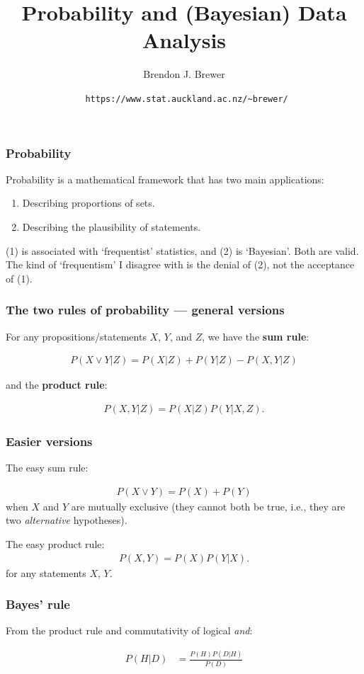 \documentclass{beamer}
\title{Probability and (Bayesian) Data Analysis}
\author{Brendon J. Brewer}
\institute{Department of Statistics\\
The University of Auckland}
\date{{\tt \color{blue} https://www.stat.auckland.ac.nz/\~{ }brewer/}}
\begin{document}
\frame{\titlepage}


\begin{frame}
\frametitle{Probability}

Probability is a mathematical framework that has two main applications:
\vspace{0.5em}
\begin{enumerate}
  \item[(1)] Describing proportions of sets.
  \item[(2)] Describing the plausibility of statements.
\end{enumerate}
\vspace{1em}
(1) is associated with `frequentist' statistics, and (2) is `Bayesian'.
Both are valid. The kind of `frequentism' I disagree with is the denial
of (2), not the acceptance of (1).

\end{frame}


\begin{frame}
\frametitle{The two rules of probability --- general versions}
For any propositions/statements $X$, $Y$, and $Z$, we have
the {\bf sum rule}:

\begin{align}
P(X \vee Y | Z) = P(X | Z) + P(Y | Z) - P(X, Y | Z)
\end{align}

and the {\bf product rule}:

\begin{align}
P(X, Y | Z) = P(X | Z)P(Y | X, Z).
\end{align}

\end{frame}


\begin{frame}
\frametitle{Easier versions}
The easy sum rule:

\begin{align}
P(X \vee Y) = P(X) + P(Y)
\end{align}
when $X$ and $Y$ are mutually exclusive (they cannot both be true, i.e.,
they are two {\em alternative} hypotheses).

The easy product rule:
\begin{align}
P(X, Y) = P(X)P(Y | X).
\end{align}
for any statements $X$, $Y$.

\end{frame}


\begin{frame}
\frametitle{Bayes' rule}

From the product rule and commutativity of logical {\em and}:

\begin{align}
P(H|D) &= \frac{P(H)P(D|H)}{P(D)}
\end{align}

\end{frame}
\end{document}
